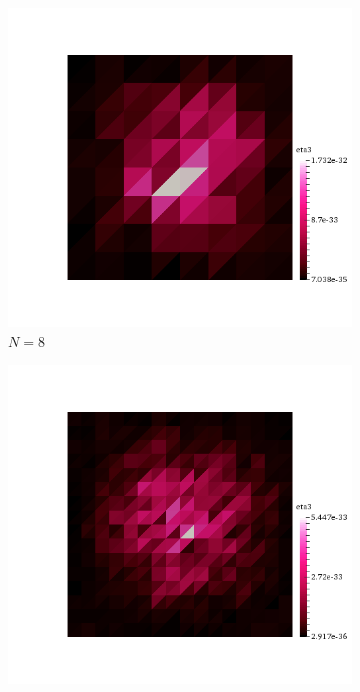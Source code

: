\mbox{}\\ \\
\begin{figure}[h!]
  \centering
  \begin{subfigure}[b]{0.24\textwidth}
    \includegraphics[width=\textwidth,height=\textheight,keepaspectratio,height=\textheight,keepaspectratio]{figures/2_mpet/default/space/eta3_8.png}
    \caption{$N=8$}
  \end{subfigure}
  \begin{subfigure}[b]{0.24\textwidth}
    \includegraphics[width=\textwidth,height=\textheight,keepaspectratio,height=\textheight,keepaspectratio]{figures/2_mpet/default/space/eta3_16.png}

\end{subfigure}
\end{figure}
